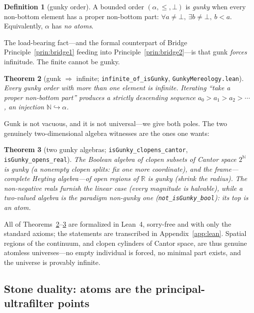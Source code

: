 \documentclass[]{article}
\newtheorem{theorem}{Theorem}
\theoremstyle{definition}
\newtheorem{definition}[theorem]{Definition}
\theoremstyle{remark}
\newcommand{\code}[1]{\texttt{#1}}
\newcommand{\lpath}[1]{{\ttfamily\nolinkurl{#1}}}
\newcommand{\R}{\mathbb{R}}
\newcommand{\N}{\mathbb{N}}
\begin{document}
\begin{definition}[gunky order]
\label{def:gunky}
A bounded order $(\alpha,\le,\bot)$ is \emph{gunky} when every non-bottom element has
a proper non-bottom part: $\forall a\neq\bot,\ \exists b\neq\bot,\ b<a$. Equivalently,
$\alpha$ has \emph{no atoms}.
\end{definition}

The load-bearing fact---and the formal counterpart of Bridge
Principle~\ref{prin:bridge1} feeding into Principle~\ref{prin:bridge2}---is that gunk
\emph{forces} infinitude. The finite cannot be gunky.

\begin{theorem}[gunk $\Rightarrow$ infinite; \code{infinite\_of\_isGunky}, \lpath{GunkyMereology.lean}]
\label{thm:gunk-inf}
Every gunky order with more than one element is infinite. Iterating ``take a proper
non-bottom part'' produces a strictly descending sequence $a_0>a_1>a_2>\cdots$, an
injection $\N\hookrightarrow\alpha$.
\end{theorem}

Gunk is not vacuous, and it is not universal---we give both poles. The two
genuinely two-dimensional algebra witnesses are the ones one wants:

\begin{theorem}[two gunky algebras; \code{isGunky\_clopens\_cantor}, \code{isGunky\_opens\_real}]
\label{thm:gunk-witness}
The Boolean algebra of \emph{clopen subsets of Cantor space} $2^{\N}$ is gunky (a
nonempty clopen splits: fix one more coordinate), and the frame---complete Heyting
algebra---of \emph{open regions of $\R$} is gunky (shrink the radius). The non-negative
reals furnish the linear case (every magnitude is halvable), while a two-valued algebra
is the paradigm non-gunky one (\code{not\_isGunky\_bool}): its top is an atom.
\end{theorem}

All of Theorems~\ref{thm:gunk-inf}--\ref{thm:gunk-witness} are formalized in Lean~4,
sorry-free and with only the standard axioms; the statements are transcribed in
Appendix~\ref{app:lean}. Spatial regions of the continuum, and clopen cylinders of
Cantor space, are thus genuine atomless universes---no empty individual is forced, no
minimal part exists, and the universe is provably infinite.

\subsection{Stone duality: atoms are the principal-ultrafilter points}
\label{sec:stone}
\end{document}
